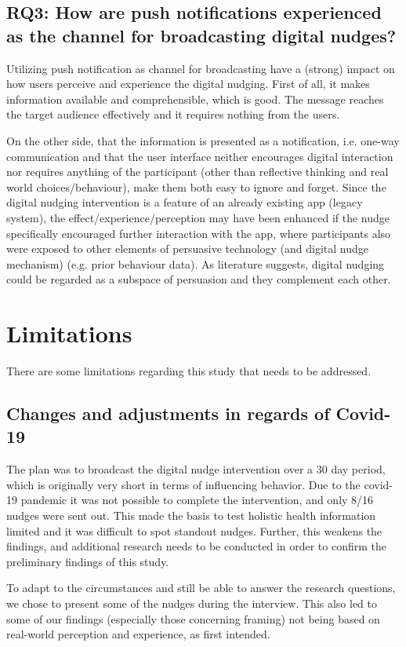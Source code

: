 \subsection{RQ3: How are push notifications experienced as the channel for broadcasting digital nudges?}
Utilizing push notification as channel for broadcasting have a (strong) impact on how users perceive and experience the digital nudging. First of all, it makes information available and comprehensible, which is good. The message reaches the target audience effectively and it requires nothing from the users.

On the other side, that the information is presented as a notification, i.e. one-way communication and that the user interface neither encourages digital interaction nor requires anything of the participant (other than reflective thinking and real world choices/behaviour), make them both easy to ignore and forget. Since the digital nudging intervention is a feature of an already existing app (legacy system), the effect/experience/perception may have been enhanced if the nudge specifically encouraged further interaction with the app, where participants also were exposed to other elements of persuasive technology (and digital nudge mechanism) (e.g. prior behaviour data). As literature suggests, digital nudging could be regarded as a subspace of persuasion and they complement each other.  

\section{Limitations}
There are some limitations regarding this study that needs to be addressed.

\subsection{Changes and adjustments in regards of Covid-19 }
The plan was to broadcast the digital nudge intervention over a 30 day period, which is originally very short in terms of influencing behavior. Due to the covid-19 pandemic it was not possible to complete the intervention, and only 8/16 nudges were sent out. This made the basis to test holistic health information limited and it was difficult to spot standout nudges. Further, this weakens the findings, and additional research needs to be conducted in order to confirm the preliminary findings of this study. 

To adapt to the circumstances and still be able to answer the research questions, we chose to present some of the nudges during the interview. This also led to some of our findings (especially those concerning framing) not being based on real-world perception and experience, as first intended. 

